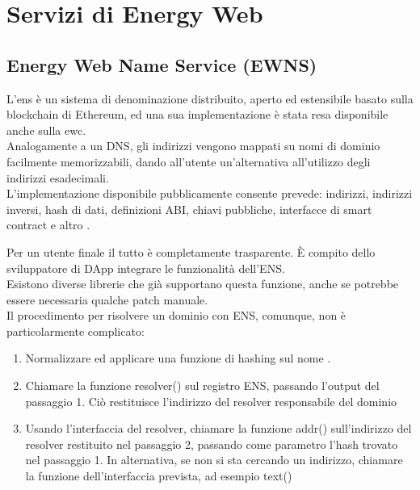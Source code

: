 \chapter{Servizi di Energy Web}

\section{Energy Web Name Service (EWNS)}
L'\gls{ens} è un sistema di denominazione distribuito, aperto ed estensibile basato sulla blockchain di Ethereum, ed una sua implementazione è stata resa disponibile anche sulla \gls{ewc}. \\
Analogamente a un DNS, gli indirizzi vengono mappati su nomi di dominio facilmente memorizzabili, dando all'utente un'alternativa all'utilizzo degli indirizzi esadecimali. \\
L'implementazione disponibile pubblicamente consente prevede: indirizzi, indirizzi inversi, hash di dati, definizioni ABI, chiavi pubbliche, interfacce di smart contract e altro \cite{wiki:ewns}.

Per un utente finale il tutto è completamente trasparente. 
È compito dello sviluppatore di DApp integrare le funzionalità dell'ENS. \\
Esistono diverse librerie che già supportano questa funzione, anche se potrebbe essere necessaria qualche patch manuale. \\
Il procedimento per risolvere un dominio con ENS, comunque, non è particolarmente complicato:

\begin{enumerate}
    \item Normalizzare ed applicare una funzione di hashing sul nome \cite{wiki:ens-normalize-name}.
    \item Chiamare la funzione resolver() sul registro ENS, passando l'output del passaggio 1. Ciò restituisce l'indirizzo del resolver responsabile del dominio
    \item Usando l'interfaccia del resolver, chiamare la funzione addr() sull'indirizzo del resolver restituito nel passaggio 2, passando come parametro l'hash trovato nel passaggio 1. In alternativa, se non si sta cercando un indirizzo, chiamare la funzione dell'interfaccia prevista, ad esempio text()
\end{enumerate}

